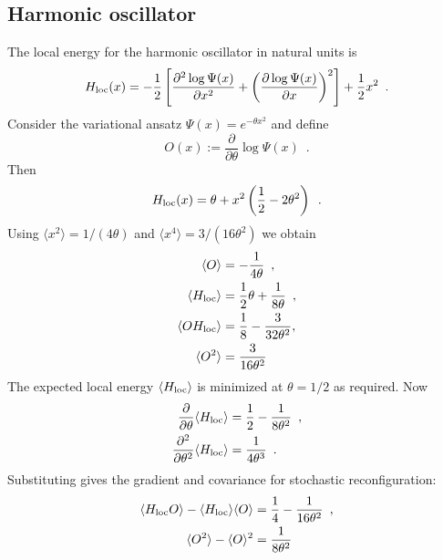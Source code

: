 \documentclass[12pt]{article}
\theoremstyle{definition}%
\theoremstyle{definition}
\theoremstyle{remark}
\begin{document}

\subsection{Harmonic oscillator}
The local energy for the harmonic oscillator in natural units is
\begin{equation}
	H_{\rm loc}(x) = -\frac{1}{2}\left[\frac{\partial^2 \log \Psi(x)}{\partial x^2} + \left(\frac{\partial \log \Psi(x)}{\partial x}\right)^2\right] + \frac{1}{2}x^2 \enspace .
\end{equation}
Consider the variational ansatz $\Psi(x) = e^{- \theta x^2}$ and define
\begin{equation}
	O(x) := \frac{\partial}{\partial \theta} \log \Psi(x) \enspace .
\end{equation} 
Then
\begin{equation}
	H_{\rm loc}(x) = \theta + x^2 \left(\frac{1}{2} - 2 \theta^2\right) \enspace .
\end{equation}
Using $\langle x^2 \rangle = 1/(4\theta)$ and $\langle x^4 \rangle = 3/(16\theta^2)$ we obtain
\begin{align}
	\langle O \rangle
		& = - \frac{1}{4\theta} \enspace , \\
	\langle H_{\rm loc} \rangle
		& = \frac{1}{2}\theta + \frac{1}{8\theta} \enspace , \\
	\langle O H_{\rm loc} \rangle
		& = \frac{1}{8} - \frac{3}{32\theta^2} , \\
	\langle O^2 \rangle
		& = \frac{3}{16\theta^2}
\end{align}
The expected local energy $\langle H_{\rm loc} \rangle$ is minimized at $\theta = 1/2$ as required. Now
\begin{align}
	\frac{\partial}{\partial \theta} \langle H_{\rm loc} \rangle
		& = \frac{1}{2} - \frac{1}{8 \theta^2} \enspace , \\
	\frac{\partial^2}{\partial \theta^2} \langle H_{\rm loc} \rangle
		& = \frac{1}{4 \theta^3} \enspace .
\end{align}
Substituting gives the gradient and covariance for stochastic reconfiguration:
\begin{align}
	 \langle H_{\rm loc} O \rangle - \langle H_{\rm loc} \rangle \langle O \rangle 
	 	& = \frac{1}{4} - \frac{1}{16 \theta^2} \enspace , \\
	 \langle O^2 \rangle - \langle O \rangle^2
	 	& = \frac{1}{8 \theta^2}
\end{align}
\end{document}
